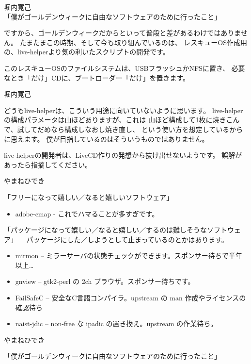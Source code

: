 \documentclass[cjk,dvipdfmx,12pt]{beamer}
\begin{document}
\begin{frame}{堀内寛己}
「僕がゴールデンウィークに自由なソフトウェアのために行ったこと」

ですから、ゴールデンウィークだからといって普段と差があるわけではありません。
たまたまこの時期、そして今も取り組んでいるのは、
レスキューOS作成用の、live-helperより気の利いたスクリプトの開発です。

このレスキューOSのファイルシステムは、USBフラッシュかNFSに置き、
必要なとき「だけ」CDに、ブートローダー「だけ」を置きます。

\end{frame}\begin{frame}{堀内寛己}

どうもlive-helperは、こういう用途に向いていないように思います。
live-helperの構成パラメータは山ほどありますが、これは
山ほど構成して1枚に焼きこんで、試してだめなら構成しなおし焼き直し、
という使い方を想定しているからに思えます。
僕が目指しているのはそういうものではありません。

live-helperの開発者は、LiveCD作りの発想から抜け出せないようです。
誤解があったら指摘してください。

\end{frame}\begin{frame}{やまねひでき}

「フリーになって嬉しい／なると嬉しいソフトウェア」

\begin{itemize}
 \item adobe-cmap - これでハマることが多すぎです。
\end{itemize}

「パッケージになって嬉しい／なると嬉しい／するのは難しそうなソフトウェア」
　パッケージにした／しようとして止まっているのとかはあります。

\begin{itemize}
 \item  mirmon	-- ミラーサーバの状態チェックができます。スポンサー待ちで半年以上…
 \item  gnview	-- gtk2-perl の 2ch ブラウザ。スポンサー待ちです。
 \item  FailSafeC  -- 安全なC言語コンパイラ。upstream の man 作成やライセンスの確認待ち
 \item  naist-jdic -- non-free な ipadic の置き換え。upstream の作業待ち。
\end{itemize}

\end{frame}\begin{frame}{やまねひでき}

「僕がゴールデンウィークに自由なソフトウェアのために行ったこと」


\end{frame}
\end{document}
